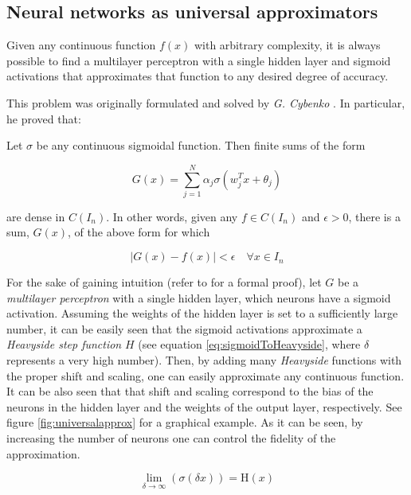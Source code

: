 \subsection{Neural networks as universal approximators}
Given any continuous function $f(x)$ with arbitrary complexity, it is always possible to find a multilayer perceptron with a single hidden layer and sigmoid activations that approximates that function to any desired degree of accuracy.

This problem was originally formulated and solved by \textit{G. Cybenko} \autocite{Cybenko1989}. In particular, he proved that:

\begin{thm}[ 2 - Cybenko, 1989]
	Let $\sigma$ be any continuous sigmoidal function. Then finite sums of the form

	$$ G(x) = \sum_{j=1}^{N} \alpha_j \sigma(w_j^Tx + \theta_j) $$

	are dense in $C(I_n)$. In other words, given any $f \in C(I_n)$ and $\epsilon > 0$, there is a sum, $G(x)$, of the above form for which

	$$|G(x) - f(x)| < \epsilon \quad \forall x \in I_n$$
\end{thm}

For the sake of gaining intuition (refer to \autocite{Cybenko1989} for a formal proof), let $G$ be a \textit{multilayer perceptron} with a single hidden layer, which neurons have a sigmoid activation. Assuming the weights of the hidden layer is set to a sufficiently large number, it can be easily seen that the sigmoid activations approximate a \textit{Heavyside step function} $H$ (see equation \ref{eq:sigmoidToHeavyside}, where $\delta$ represents a very high number). Then, by adding many \textit{Heavyside} functions with the proper shift and scaling, one can easily approximate any continuous function. It can be also seen that that shift and scaling correspond to the bias of the neurons in the hidden layer and the weights of the output layer, respectively. See figure \ref{fig:universalapprox} for a graphical example. As it can be seen, by increasing the number of neurons one can control the fidelity of the approximation.


\begin{equation}
	\label{eq:sigmoidToHeavyside}
	\lim_{\delta \rightarrow \infty} (\sigma(\delta x)) = \mathrm{H}(x)
\end{equation}

